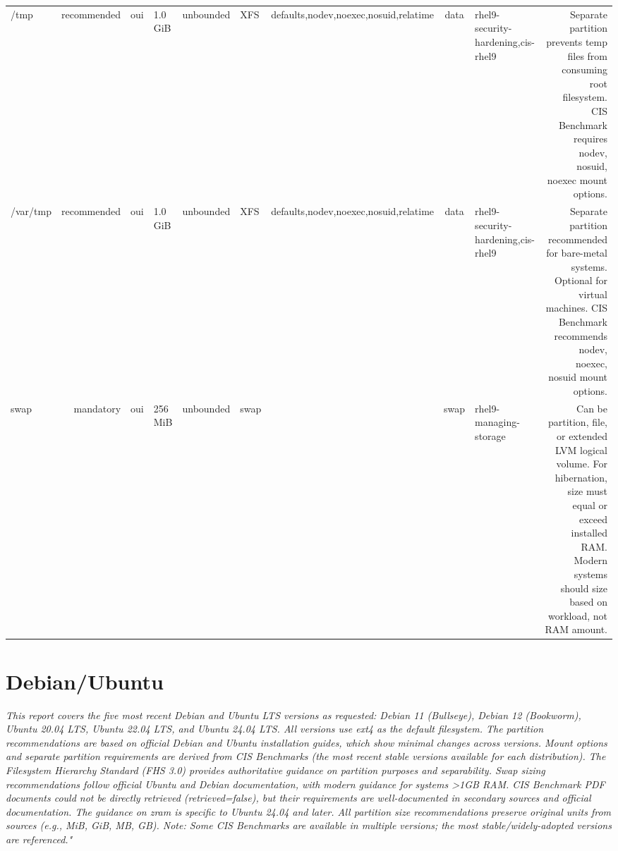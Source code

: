 \documentclass[10pt,a4paper]{article}
\begin{document}
{\begin{longtable}{M R S Z Z T O C I N}
/tmp & \textcolor{cHigh}{recommended} & \textcolor{cOk}{oui} & 1.0 GiB & unbounded & XFS & defaults,nodev,noexec,nosuid,relatime & data & rhel9-security-hardening,cis-rhel9 & Separate partition prevents temp files from consuming root filesystem. CIS Benchmark requires nodev, nosuid, noexec mount options.\\
/var/tmp & \textcolor{cHigh}{recommended} & \textcolor{cOk}{oui} & 1.0 GiB & unbounded & XFS & defaults,nodev,noexec,nosuid,relatime & data & rhel9-security-hardening,cis-rhel9 & Separate partition recommended for bare-metal systems. Optional for virtual machines. CIS Benchmark recommends nodev, noexec, nosuid mount options.\\
swap & \textcolor{cBlock}{mandatory} & \textcolor{cOk}{oui} & 256 MiB & unbounded & swap &  & swap & rhel9-managing-storage & Can be partition, file, or extended LVM logical volume. For hibernation, size must equal or exceed installed RAM. Modern systems should size based on workload, not RAM amount.\\
\bottomrule\end{longtable}}
\clearpage
\section{Debian/Ubuntu}
\noindent\small\textit{This report covers the five most recent Debian and Ubuntu LTS versions as requested: Debian 11 (Bullseye), Debian 12 (Bookworm), Ubuntu 20.04 LTS, Ubuntu 22.04 LTS, and Ubuntu 24.04 LTS. All versions use ext4 as the default filesystem. The partition recommendations are based on official Debian and Ubuntu installation guides, which show minimal changes across versions. Mount options and separate partition requirements are derived from CIS Benchmarks (the most recent stable versions available for each distribution). The Filesystem Hierarchy Standard (FHS 3.0) provides authoritative guidance on partition purposes and separability. Swap sizing recommendations follow official Ubuntu and Debian documentation, with modern guidance for systems >1GB RAM. CIS Benchmark PDF documents could not be directly retrieved (retrieved=false), but their requirements are well-documented in secondary sources and official documentation. The guidance on zram is specific to Ubuntu 24.04 and later. All partition size recommendations preserve original units from sources (e.g., MiB, GiB, MB, GB). Note: Some CIS Benchmarks are available in multiple versions; the most stable/widely-adopted versions are referenced."}\normalsize\par\medskip
\end{document}
